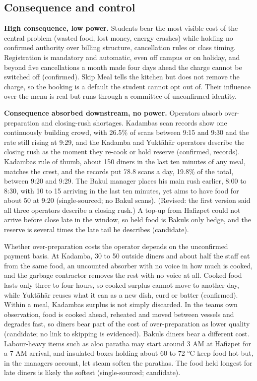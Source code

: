 \documentclass[
  10pt,
  table]{article}
\begin{document}
\subsection{Consequence and control}\label{consequence-and-control}

\textbf{High consequence, low power.} Students bear the most visible cost of the central problem (wasted food, lost money, energy crashes) while holding no confirmed authority over billing structure, cancellation rules or class timing. Registration is mandatory and automatic, even off campus or on holiday, and beyond five cancellations a month made four days ahead the charge cannot be switched off (confirmed). Skip Meal tells the kitchen but does not remove the charge, so the booking is a default the student cannot opt out of. Their influence over the menu is real but runs through a committee of unconfirmed identity.

\textbf{Consequence absorbed downstream, no power.} Operators absorb over-preparation and closing-rush shortages. Kadamba\textquotesingle s scan records show one continuously building crowd, with 26.5\% of scans between 9:15 and 9:30 and the rate still rising at 9:29, and the Kadamba and Yuktāhār operators describe the closing rush as the moment they re-cook or hold reserve (confirmed, records). Kadamba\textquotesingle s rule of thumb, about 150 diners in the last ten minutes of any meal, matches the crest, and the records put 78.8 scans a day, 19.8\% of the total, between 9:20 and 9:29. The Bakul manager places his main rush earlier, 8:00 to 8:30, with 10 to 15 arriving in the last ten minutes, yet aims to have food for about 50 at 9:20 (single-sourced; no Bakul scans). (Revised: the first version said all three operators describe a closing rush.) A top-up from Hafizpet could not arrive before close late in the window, so held food is Bakul\textquotesingle s only hedge, and the reserve is several times the late tail he describes (candidate).

Whether over-preparation costs the operator depends on the unconfirmed payment basis. At Kadamba, 30 to 50 outside diners and about half the staff eat from the same food, an uncounted absorber with no voice in how much is cooked, and the garbage contractor removes the rest with no voice at all. Cooked food lasts only three to four hours, so cooked surplus cannot move to another day, while Yuktāhār reuses what it can as a new dish, curd or batter (confirmed). Within a meal, Kadamba\textquotesingle s surplus is not simply discarded. In the team\textquotesingle s own observation, food is cooked ahead, reheated and moved between vessels and degrades fast, so diners bear part of the cost of over-preparation as lower quality (candidate; no link to skipping is evidenced). Bakul\textquotesingle s diners bear a different cost. Labour-heavy items such as aloo paratha may start around 3 AM at Hafizpet for a 7 AM arrival, and insulated boxes holding about 60 to 72 °C keep food hot but, in the manager\textquotesingle s account, let steam soften the parathas. The food held longest for late diners is likely the softest (single-sourced; candidate).
\end{document}
